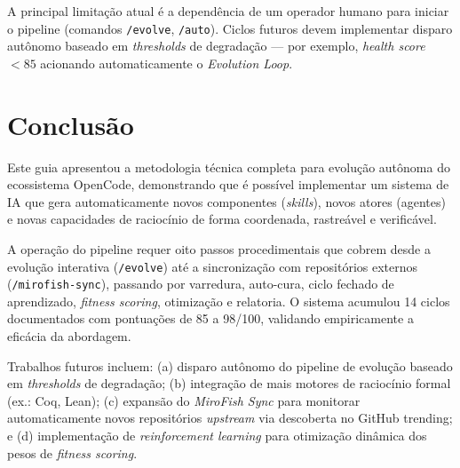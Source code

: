 \documentclass[
  article,
  12pt,
  oneside,
  a4paper,
  brazil,
  sumario=tradicional
]{abntex2}
\begin{document}
A principal limitação atual é a dependência de um operador humano para iniciar o pipeline (comandos \texttt{/evolve}, \texttt{/auto}). Ciclos futuros devem implementar disparo autônomo baseado em \emph{thresholds} de degradação --- por exemplo, \emph{health score} $< 85$ acionando automaticamente o \emph{Evolution Loop}.

\section{Conclusão}

Este guia apresentou a metodologia técnica completa para evolução autônoma do ecossistema OpenCode, demonstrando que é possível implementar um sistema de IA que gera automaticamente novos componentes (\emph{skills}), novos atores (agentes) e novas capacidades de raciocínio de forma coordenada, rastreável e verificável.

A operação do pipeline requer oito passos procedimentais que cobrem desde a evolução interativa (\texttt{/evolve}) até a sincronização com repositórios externos (\texttt{/mirofish-sync}), passando por varredura, auto-cura, ciclo fechado de aprendizado, \emph{fitness scoring}, otimização e relatoria. O sistema acumulou 14 ciclos documentados com pontuações de 85 a 98/100, validando empiricamente a eficácia da abordagem.

Trabalhos futuros incluem: (a) disparo autônomo do pipeline de evolução baseado em \emph{thresholds} de degradação; (b) integração de mais motores de raciocínio formal (ex.: Coq, Lean); (c) expansão do \emph{MiroFish Sync} para monitorar automaticamente novos repositórios \emph{upstream} via descoberta no GitHub trending; e (d) implementação de \emph{reinforcement learning} para otimização dinâmica dos pesos de \emph{fitness scoring}.
\end{document}
